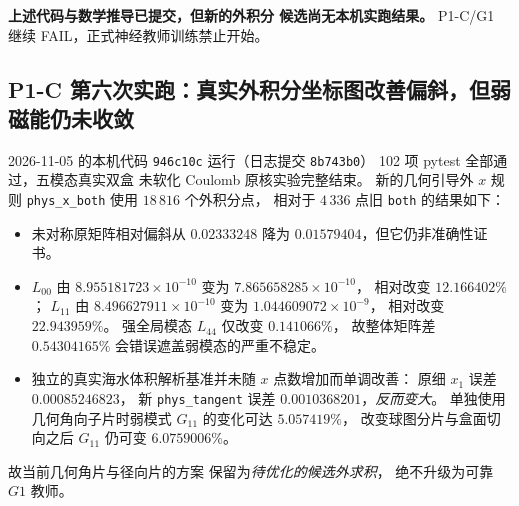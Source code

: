 \textbf{上述代码与数学推导已提交，但新的外积分
候选尚无本机实跑结果。}
P1-C/G1 继续 FAIL，正式神经教师训练禁止开始。


\subsection{P1-C 第六次实跑：真实外积分坐标图改善偏斜，但弱磁能仍未收敛}
\label{sec:p1-c-sixth-exact-scalar-control}
2026-11-05 的本机代码 \texttt{946c10c}
运行（日志提交 \texttt{8b743b0}）
102 项 pytest 全部通过，五模态真实双盒
未软化 Coulomb 原核实验完整结束。
新的几何引导外 $x$ 规则
\texttt{phys\_x\_both}
使用 $18\,816$ 个外积分点，
相对于 $4\,336$ 点旧
\texttt{both} 的结果如下：
\begin{itemize}
\item 未对称原矩阵相对偏斜从 $0.02333248$
      降为 $0.01579404$，但它仍非准确性证书。
\item $L_{00}$ 由 $8.955181723\times10^{-10}$
      变为 $7.865658285\times10^{-10}$，
      相对改变 $12.166402\%$；
      $L_{11}$ 由 $8.496627911\times10^{-10}$
      变为 $1.044609072\times10^{-9}$，
      相对改变 $22.943959\%$。
      强全局模态 $L_{44}$ 仅改变 $0.141066\%$，
      故整体矩阵差 $0.54304165\%$
      会错误遮盖弱模态的严重不稳定。
\item 独立的真实海水体积解析基准并未随
      $x$ 点数增加而单调改善：
      原细 $x_1$ 误差 $0.00085246823$，
      新 \texttt{phys\_tangent} 误差
      $0.0010368201$，\emph{反而变大}。
      单独使用几何角向子片时弱模式
      $G_{11}$ 的变化可达 $5.057419\%$，
      改变球图分片与盒面切向之后
      $G_{11}$ 仍可变 $6.0759006\%$。
\end{itemize}
故当前几何角片与径向片的方案
保留为\emph{待优化的候选外求积}，
绝不升级为可靠 $G1$ 教师。

